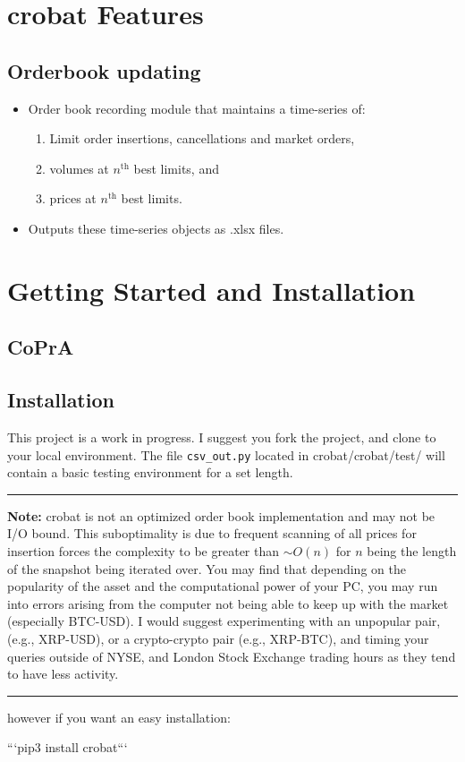 \newpage
\section{crobat Features} 

\subsection{Orderbook updating}
\begin{itemize}
	\item Order book recording module that maintains a time-series of:
	\begin{enumerate}
		\item Limit order insertions, cancellations and market orders,
		\item volumes at $n^{\textrm{th}}$ best limits, and
		\item prices at  $n^{\textrm{th}}$ best limits.
	\end{enumerate}
	\item Outputs these time-series objects as .xlsx files.
\end{itemize}

\newpage

\section{Getting Started and Installation}

\subsection{CoPrA}

\subsection{Installation}

This project is a work in progress. I suggest you fork the project, and clone to your local environment. The file \texttt{csv\_out.py} located in crobat/crobat/test/ will contain a basic testing environment for a set length. 
\medskip
\hrule
\smallskip
\noindent \textbf{Note:} crobat is not an optimized order book implementation and may not be I/O bound. This suboptimality is due to frequent scanning of all prices for insertion forces the complexity to be greater than $\sim O(n)$ for $n$ being the length of the snapshot being iterated over. You may find that depending on the popularity of the asset and the computational power of your PC, you may run into errors arising from the computer not being able to keep up with the market (especially BTC-USD). I would suggest experimenting with an unpopular pair, (e.g.,  XRP-USD), or a crypto-crypto pair (e.g., XRP-BTC), and timing your queries outside of NYSE, and London Stock Exchange trading hours as they tend to have less activity.
\smallskip
\hrule
however if you want an easy installation: 

```pip3 install crobat``` 

\newpage